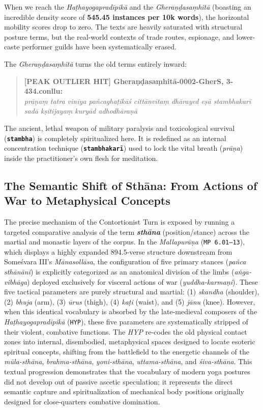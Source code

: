 \documentclass[11pt,letterpaper]{article}
\begin{document}
When we reach the \textit{Haṭhayogapradīpikā} and the \textit{Gheraṇḍasaṃhitā} (boasting an incredible density score of \textbf{545.45 instances per 10k words}), the horizontal mobility scores drop to zero. The texts are heavily saturated with structural posture terms, but the real-world contexts of trade routes, espionage, and lower-caste performer guilds have been systematically erased. 

The \textit{Gheraṇḍasaṃhitā} turns the old terms entirely inward:

\begin{quotation}
\noindent \textbf{[PEAK OUTLIER HIT] Gheraṇḍasaṃhitā-0002-GherS, 3-434.conllu:} \\
\textit{prāṇaṃ tatra vinīya pañcaghaṭikāś cittānvitaṃ dhārayed eṣā stambhakarī sadā kṣitijayaṃ kuryād adhodhāraṇā}
\end{quotation}

The ancient, lethal weapon of military paralysis and toxicological survival (\textbf{\texttt{stambha}}) is completely spiritualized here. It is redefined as an internal concentration technique (\textbf{\texttt{stambhakarī}}) used to lock the vital breath (\textit{prāṇa}) inside the practitioner's own flesh for meditation.

\subsection{The Semantic Shift of Sthāna: From Actions of War to Metaphysical Concepts}
The precise mechanism of the Contortionist Turn is exposed by running a targeted comparative analysis of the term \textbf{\textit{sthāna}} (position/stance) across the martial and monastic layers of the corpus. In the \textit{Mallapurāṇa} (\texttt{MP 6.01--13}), which displays a highly expanded 894.5-verse structure downstream from Someśvara III’s \textit{Mānasollāsa}, the configuration of five primary stances (\textit{pañca sthānāni}) is explicitly categorized as an anatomical division of the limbs (\textit{aṅga-vibhāga}) deployed exclusively for visceral actions of war (\textit{yuddha-karmaṇi}). These five tactical parameters are purely structural and martial: (1) \textit{skandha} (shoulder), (2) \textit{bhuja} (arm), (3) \textit{ūrus} (thigh), (4) \textit{kaṭi} (waist), and (5) \textit{jānu} (knee). However, when this identical vocabulary is absorbed by the late-medieval composers of the \textit{Haṭhayogapradīpikā} (\texttt{HYP}), these five parameters are systematically stripped of their violent, combative functions. The \textit{HYP} re-codes the old physical contact zones into internal, disembodied, metaphysical spaces designed to locate esoteric spiritual concepts, shifting from the battlefield to the energetic channels of the \textit{mūla-sthāna}, \textit{brahma-sthāna}, \textit{yoni-sthāna}, \textit{uttama-sthāna}, and \textit{śiva-sthāna}. This textual progression demonstrates that the vocabulary of modern yoga postures did not develop out of passive ascetic speculation; it represents the direct semantic capture and spiritualization of mechanical body positions originally designed for close-quarters combative domination.
\end{document}
